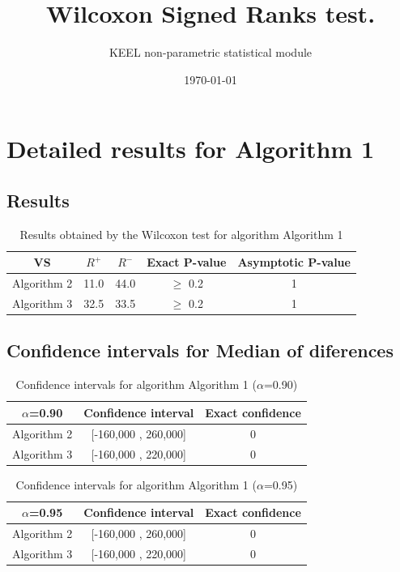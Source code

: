 \documentclass[a4paper,10pt]{article}
\title{Wilcoxon Signed Ranks test.}
\date{\today}
\author{KEEL non-parametric statistical module}
\begin{document}
\pagestyle{empty}
\maketitle
\thispagestyle{empty}



\section{Detailed results for Algorithm 1}


\subsection{Results}

\begin{table}[!htp]
\centering\small
\begin{tabular}{
|c|c|c|c|c|}
\hline
 VS & $R^{+}$ & $R^{-}$ & Exact P-value & Asymptotic P-value \\ \hline 
Algorithm 2 & 11.0 & 44.0 & $\geq$ 0.2 & 1\\ \hline 
Algorithm 3 & 32.5 & 33.5 & $\geq$ 0.2 & 1\\ \hline 

\end{tabular}
\caption{Results obtained by the Wilcoxon test for algorithm Algorithm 1}
\end{table}

\subsection{Confidence intervals for Median of diferences}

\begin{table}[!htp]
\centering\small
\begin{tabular}{
|c|c|c|}
\hline
 $\alpha$=0.90 & Confidence interval & Exact confidence \\ \hline 
Algorithm 2 & [-160,000 , 260,000] & 0\\ \hline 
Algorithm 3 & [-160,000 , 220,000] & 0\\ \hline 

\end{tabular}
\caption{Confidence intervals for algorithm Algorithm 1 ($\alpha$=0.90)}
\end{table}
\begin{table}[!htp]
\centering\small
\begin{tabular}{
|c|c|c|}
\hline
 $\alpha$=0.95 & Confidence interval & Exact confidence \\ \hline 
Algorithm 2 & [-160,000 , 260,000] & 0\\ \hline 
Algorithm 3 & [-160,000 , 220,000] & 0\\ \hline 

\end{tabular}
\caption{Confidence intervals for algorithm Algorithm 1 ($\alpha$=0.95)}
\end{table}
\end{document}
